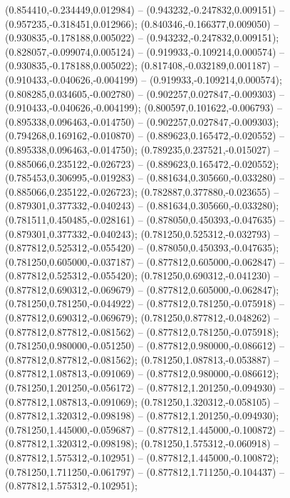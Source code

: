  (0.854410,-0.234449,0.012984) -- (0.943232,-0.247832,0.009151) -- (0.957235,-0.318451,0.012966);
 (0.840346,-0.166377,0.009050) -- (0.930835,-0.178188,0.005022) -- (0.943232,-0.247832,0.009151);
 (0.828057,-0.099074,0.005124) -- (0.919933,-0.109214,0.000574) -- (0.930835,-0.178188,0.005022);
 (0.817408,-0.032189,0.001187) -- (0.910433,-0.040626,-0.004199) -- (0.919933,-0.109214,0.000574);
 (0.808285,0.034605,-0.002780) -- (0.902257,0.027847,-0.009303) -- (0.910433,-0.040626,-0.004199);
 (0.800597,0.101622,-0.006793) -- (0.895338,0.096463,-0.014750) -- (0.902257,0.027847,-0.009303);
 (0.794268,0.169162,-0.010870) -- (0.889623,0.165472,-0.020552) -- (0.895338,0.096463,-0.014750);
 (0.789235,0.237521,-0.015027) -- (0.885066,0.235122,-0.026723) -- (0.889623,0.165472,-0.020552);
 (0.785453,0.306995,-0.019283) -- (0.881634,0.305660,-0.033280) -- (0.885066,0.235122,-0.026723);
 (0.782887,0.377880,-0.023655) -- (0.879301,0.377332,-0.040243) -- (0.881634,0.305660,-0.033280);
 (0.781511,0.450485,-0.028161) -- (0.878050,0.450393,-0.047635) -- (0.879301,0.377332,-0.040243);
 (0.781250,0.525312,-0.032793) -- (0.877812,0.525312,-0.055420) -- (0.878050,0.450393,-0.047635);
 (0.781250,0.605000,-0.037187) -- (0.877812,0.605000,-0.062847) -- (0.877812,0.525312,-0.055420);
 (0.781250,0.690312,-0.041230) -- (0.877812,0.690312,-0.069679) -- (0.877812,0.605000,-0.062847);
 (0.781250,0.781250,-0.044922) -- (0.877812,0.781250,-0.075918) -- (0.877812,0.690312,-0.069679);
 (0.781250,0.877812,-0.048262) -- (0.877812,0.877812,-0.081562) -- (0.877812,0.781250,-0.075918);
 (0.781250,0.980000,-0.051250) -- (0.877812,0.980000,-0.086612) -- (0.877812,0.877812,-0.081562);
 (0.781250,1.087813,-0.053887) -- (0.877812,1.087813,-0.091069) -- (0.877812,0.980000,-0.086612);
 (0.781250,1.201250,-0.056172) -- (0.877812,1.201250,-0.094930) -- (0.877812,1.087813,-0.091069);
 (0.781250,1.320312,-0.058105) -- (0.877812,1.320312,-0.098198) -- (0.877812,1.201250,-0.094930);
 (0.781250,1.445000,-0.059687) -- (0.877812,1.445000,-0.100872) -- (0.877812,1.320312,-0.098198);
 (0.781250,1.575312,-0.060918) -- (0.877812,1.575312,-0.102951) -- (0.877812,1.445000,-0.100872);
 (0.781250,1.711250,-0.061797) -- (0.877812,1.711250,-0.104437) -- (0.877812,1.575312,-0.102951);

